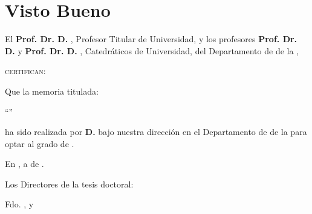 \chapter*{Visto Bueno}
\thispagestyle{empty}
\bigskip


\vfil

El \textbf{Prof. Dr. D. \myDirectorOne}, Profesor Titular de Universidad, y los profesores \textbf{Prof. Dr. D. \myDirectorTwo} y \textbf{Prof. Dr. D. \myDirectorThree}, Catedráticos de Universidad,  del Departamento de \myDepartment de la \myUni,

\bigskip

\textsc{certifican:}

\bigskip

\noindent Que la memoria titulada:
\begin{center}
``\textbf{\emph{\myTitle}}''
\end{center}
ha sido realizada por \textbf{D. \myName} bajo nuestra dirección en el Departamento de \myDepartment de la \myUni para optar al grado de \textbf{\myDegree}.

\vfil

\begin{center}
En \myLocation, a \myDay\xspace de \myTime.
\end{center}
\vfil
Los Directores de la tesis doctoral:\\
\vspace{2cm}

\hfil Fdo. \myDirectorOne, \hfil  \myDirectorTwo \xspace y \hfil  \myDirectorThree \hfil
